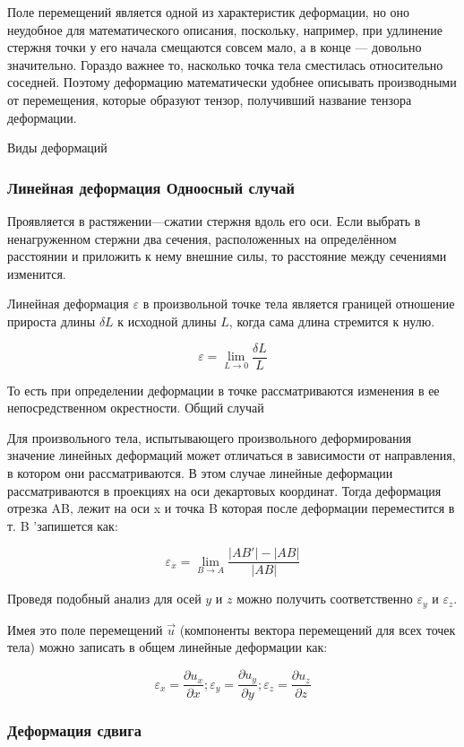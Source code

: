 Поле перемещений является одной из характеристик деформации, но оно неудобное для математического описания, поскольку, например, при удлинение стержня точки у его начала смещаются совсем мало, а в конце — довольно значительно. Гораздо важнее то, насколько точка тела сместилась относительно соседней. Поэтому деформацию математически удобнее описывать производными от перемещения, которые образуют тензор, получивший название тензора деформации.

Виды деформаций
\subsubsection{Линейная деформация Одноосный случай}

Проявляется в растяжении—сжатии стержня вдоль его оси. Если выбрать в ненагруженном стержни два сечения, расположенных на определённом расстоянии и приложить к нему внешние силы, то расстояние между сечениями изменится.

Линейная деформация $\varepsilon$ в произвольной точке тела является границей отношение прироста длины $\delta L$ к исходной длины $L$, когда сама длина стремится к нулю.

\[ \varepsilon = \lim_{L \to 0} \frac{{\delta} {L}} {L} \]

То есть при определении деформации в точке рассматриваются изменения в ее непосредственном окрестности.
Общий случай

Для произвольного тела, испытывающего произвольного деформирования значение линейных деформаций может отличаться в зависимости от направления, в котором они рассматриваются. В этом случае линейные деформации рассматриваются в проекциях на оси декартовых координат. Тогда деформация отрезка AB, лежит на оси x и точка B которая после деформации переместится в т. B 'запишется как:

\[ \varepsilon_x = \lim_{B \to A} {\frac{| AB '| - | AB |}{| AB |}} \]

Проведя подобный анализ для осей $y$ и $z$ можно получить соответственно $\varepsilon_y$ и $\varepsilon_z$.

Имея это поле перемещений $\overrightarrow u$ (компоненты вектора перемещений для всех точек тела) можно записать в общем линейные деформации как:

\[\varepsilon_x = {\frac{\partial u_x}{\partial x}}; \varepsilon_y = {\frac{\partial u_y}{\partial y}}; \varepsilon_z = {\frac{\partial u_z}{\partial z}} \]

\subsubsection{Деформация сдвига}

